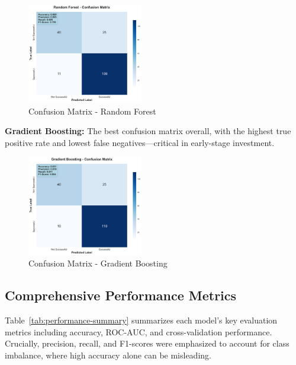 \documentclass[conference]{IEEEtran}
\begin{document}
\begin{figure}[H]
    \centering
    \includegraphics[width=0.45\textwidth]{confusion_matrix_random_forest.png}
    \caption{Confusion Matrix - Random Forest}
\end{figure}

\textbf{Gradient Boosting:} The best confusion matrix overall, with the highest true positive rate and lowest false negatives—critical in early-stage investment.

\begin{figure}[H]
    \centering
    \includegraphics[width=0.45\textwidth]{confusion_matrix_gradient_boosting.png}
    \caption{Confusion Matrix - Gradient Boosting}
\end{figure}

\subsection{Comprehensive Performance Metrics}

Table~\ref{tab:performance-summary} summarizes each model’s key evaluation metrics including accuracy, ROC-AUC, and cross-validation performance. Crucially, precision, recall, and F1-scores were emphasized to account for class imbalance, where high accuracy alone can be misleading.

\begin{table}[H]
\centering
\caption{Model Performance Summary}
\label{tab:performance-summary}
\end{table}
\end{document}
